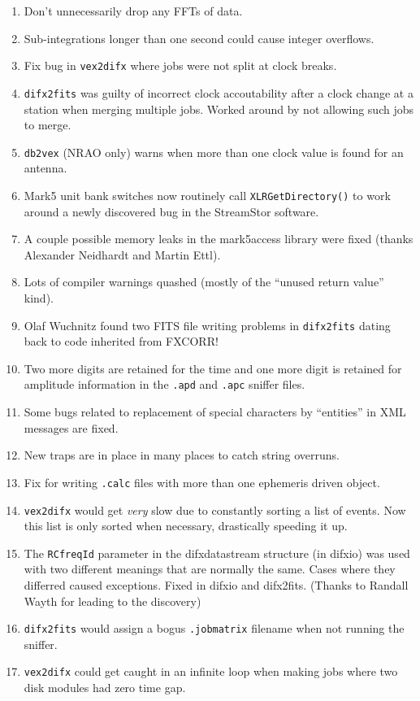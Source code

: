\begin{enumerate}
\item Don't unnecessarily drop any FFTs of data.
\item Sub-integrations longer than one second could cause integer overflows.
\item Fix bug in {\tt vex2difx} where jobs were not split at clock breaks.
\item {\tt difx2fits} was guilty of incorrect clock accoutability after a clock change at a station when merging multiple jobs.  Worked around by not allowing such jobs to merge.
\item {\tt db2vex} (NRAO only) warns when more than one clock value is found for an antenna.
\item Mark5 unit bank switches now routinely call {\tt XLRGetDirectory()} to work around a newly discovered bug in the StreamStor software.
\item A couple possible memory leaks in the mark5access library were fixed (thanks Alexander Neidhardt and Martin Ettl).
\item Lots of compiler warnings quashed (mostly of the ``unused return value'' kind).
\item Olaf Wuchnitz found two FITS file writing problems in {\tt difx2fits} dating back to code inherited from FXCORR!
\item Two more digits are retained for the time and one more digit is retained for amplitude information in the {\tt .apd} and {\tt .apc} sniffer files.
\item Some bugs related to replacement of special characters by ``entities'' in XML messages are fixed.
\item New traps are in place in many places to catch string overruns.
\item Fix for writing {\tt .calc} files with more than one ephemeris driven object.
\item {\tt vex2difx} would get {\em very} slow due to constantly sorting a list of events.  Now this list is only sorted when necessary, drastically speeding it up.
\item The {\tt RCfreqId} parameter in the difxdatastream structure (in difxio) was used with two different meanings that are normally the same.  Cases where they differred caused exceptions.  Fixed in difxio and difx2fits. (Thanks to Randall Wayth for leading to the discovery)
\item {\tt difx2fits} would assign a bogus {\tt .jobmatrix} filename when not running the sniffer.
\item {\tt vex2difx} could get caught in an infinite loop when making jobs where two disk modules had zero time gap.

\end{enumerate}

